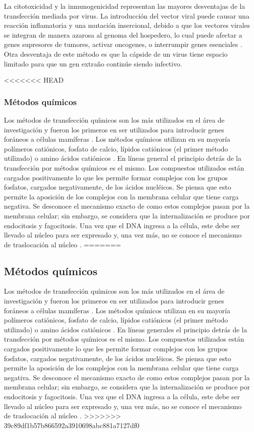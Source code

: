 \documentclass[fleqn,10pt]{SelfArx} %
\begin{document}
La citotoxicidad y la inmunogenicidad representan las mayores desventajas de la transfección mediada por virus. La introducción del vector viral puede causar una reacción inflamatoria y una mutación insercional, debido a que los vectores virales se integran de manera azarosa al genoma del hospedero, lo cual puede afectar a genes supresores de tumores, activar oncogenes, o interrumpir genes esenciales \cite{Woods:2003aa}. Otra desventaja de este método es que la cápside de un virus tiene espacio limitado para que un gen extraño continúe siendo infectivo. 

<<<<<<< HEAD
\subsubsection{Métodos químicos}
Los métodos de transfección químicos son los más utilizados en el área de investigación y fueron los primeros en ser utilizados para introducir genes foráneos a células mamíferas \cite{Schenborn2000}. Los métodos químicos utilizan en su mayoría polímeros catiónicos, fosfato de calcio, lípidos catiónicos (el primer método utilizado) o amino ácidos catiónicos \cite{Schenborn2000, Holmen:1995aa, Washbourne:2002aa}. En líneas general el principio detrás de la transfección por métodos químicos es el mismo. Los compuestos utilizados están cargados positivamente lo que les permite formar complejos con los grupos fosfatos, cargados negativamente, de los ácidos nucléicos. Se piensa que esto permite la aposición de los complejos con la membrana celular que tiene carga negativa. Se desconoce el mecanismo exacto de como estos complejos pasan por la membrana celular; sin embargo, se considera que la internalización se produce por endocitosis y fagocitosis. Una vez que el DNA ingresa a la célula, este debe ser llevado al núcleo para ser expresado y, una vez más, no se conoce el mecanismo de traslocación al núcleo \cite{Kim:2010aa}. 
=======
\subsection{Métodos químicos}
Los métodos de transfección químicos son los más utilizados en el área de investigación y fueron los primeros en ser utilizados para introducir genes foráneos a células mamíferas \cite{Schenborn2000}. Los métodos químicos utilizan en su mayoría polímeros catiónicos, fosfato de calcio, lípidos catiónicos (el primer método utilizado) o amino ácidos catiónicos \cite{Schenborn2000, Holmen:1995aa, Washbourne:2002aa}. En líneas generales el principio detrás de la transfección por métodos químicos es el mismo. Los compuestos utilizados están cargados positivamente lo que les permite formar complejos con los grupos fosfatos, cargados negativamente, de los ácidos nucléicos. Se piensa que esto permite la aposición de los complejos con la membrana celular que tiene carga negativa. Se desconoce el mecanismo exacto de como estos complejos pasan por la membrana celular; sin embargo, se considera que la internalización se produce por endocitosis y fagocitosis. Una vez que el DNA ingresa a la célula, este debe ser llevado al núcleo para ser expresado y, una vez más, no se conoce el mecanismo de traslocación al núcleo \cite{Kim:2010aa}. 
>>>>>>> 39c89df1b57b866592a3910698abc881a7127df0
\end{document}
